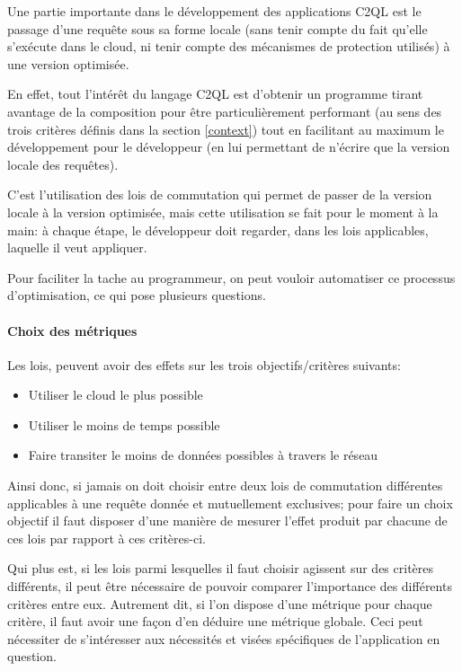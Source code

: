 Une partie importante dans le développement des
applications C2QL est le passage d'une requête
sous sa forme locale (sans tenir compte
du fait qu'elle s'exécute dans le cloud,
ni tenir compte des mécanismes de protection utilisés)
à une version optimisée.

En effet, tout l'intérêt du langage C2QL est d'obtenir
un programme tirant avantage de la composition
pour être particulièrement performant
(au sens des trois critères définis dans la section
\ref{context}) tout en facilitant au maximum
le développement pour le développeur
(en lui permettant de n'écrire que la version locale
des requêtes).

C'est l'utilisation des lois de commutation qui permet
de passer de la version locale à la version
optimisée, mais cette utilisation se fait pour le moment à
la main: à chaque étape, le développeur doit regarder, 
dans les lois applicables, laquelle il veut appliquer.

Pour faciliter la tache au programmeur, on peut
vouloir automatiser ce processus d'optimisation,
ce qui pose plusieurs questions.

\paragraph{Choix des métriques}
Les lois, peuvent avoir des effets sur les trois
objectifs/critères suivants:
\begin{itemize}
	\item Utiliser le cloud le plus possible
	\item Utiliser le moins de temps possible
	\item Faire transiter le moins de données
	possibles à travers le réseau
\end{itemize}
Ainsi donc, si jamais on doit choisir entre deux lois de commutation différentes applicables à une requête donnée
et mutuellement exclusives; pour faire un choix objectif
il faut disposer d'une manière de mesurer l'effet produit
par chacune de ces lois par rapport à ces critères-ci.

Qui plus est, si les lois parmi lesquelles il faut choisir
agissent sur des critères différents, il
peut être nécessaire de pouvoir comparer l'importance des
différents critères entre eux. Autrement dit,
si l'on dispose d'une métrique pour chaque critère,
il faut avoir une façon d'en déduire une métrique
globale. Ceci peut nécessiter de s'intéresser aux
nécessités et visées spécifiques de l'application en question.

